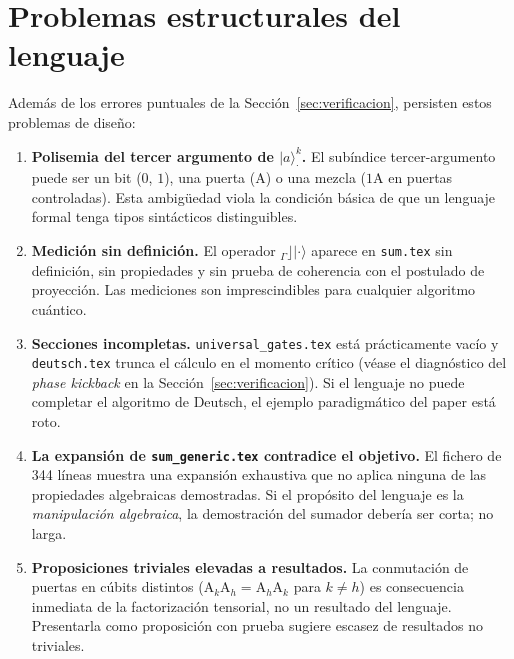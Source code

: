 \documentclass[12pt, a4paper]{article}
\newcommand{\gate}[1]{\text{#1}}
\newcommand{\stateket}[3]{\ket{#1}^{#2}_{#3}}
\newcommand{\ket}[1]{|#1\rangle}
\begin{document}
\section{Problemas estructurales del lenguaje}

Además de los errores puntuales de la Sección~\ref{sec:verificacion},
persisten estos problemas de diseño:

\begin{enumerate}
  \item \textbf{Polisemia del tercer argumento de $\stateket{a}{k}{\cdot}$.}
        El subíndice tercer-argumento puede ser un bit ($0$, $1$), una puerta
        ($\gate{A}$) o una mezcla ($1\gate{A}$ en puertas controladas). Esta
        ambigüedad viola la condición básica de que un lenguaje formal tenga
        tipos sintácticos distinguibles.

  \item \textbf{Medición sin definición.}
        El operador $_{{\Gamma}}\rfloor\ket{\cdot}$ aparece en \texttt{sum.tex}
        sin definición, sin propiedades y sin prueba de coherencia con el
        postulado de proyección. Las mediciones son imprescindibles para
        cualquier algoritmo cuántico.

  \item \textbf{Secciones incompletas.}
        \texttt{universal\_gates.tex} está prácticamente vacío y
        \texttt{deutsch.tex} trunca el cálculo en el momento crítico (véase
        el diagnóstico del \emph{phase kickback} en la
        Sección~\ref{sec:verificacion}). Si el lenguaje no puede completar el
        algoritmo de Deutsch, el ejemplo paradigmático del paper está roto.

  \item \textbf{La expansión de \texttt{sum\_generic.tex} contradice el objetivo.}
        El fichero de 344 líneas muestra una expansión exhaustiva que no aplica
        ninguna de las propiedades algebraicas demostradas. Si el propósito del
        lenguaje es la \emph{manipulación algebraica}, la demostración del
        sumador debería ser corta; no larga.

  \item \textbf{Proposiciones triviales elevadas a resultados.}
        La conmutación de puertas en cúbits distintos ($\gate{A}_k \gate{A}_h
          = \gate{A}_h \gate{A}_k$ para $k \neq h$) es consecuencia inmediata
        de la factorización tensorial, no un resultado del lenguaje.
        Presentarla como proposición con prueba sugiere escasez de resultados
        no triviales.


\end{enumerate}
\end{document}
